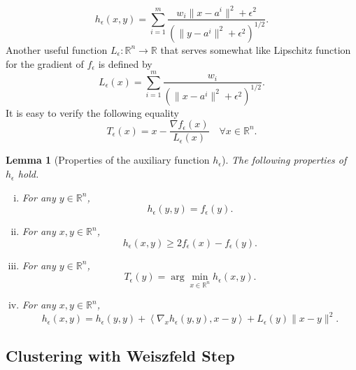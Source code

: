 \documentclass[11pt]{article}
\numberwithin{equation}{section}
\newtheorem{lemma}{Lemma}[proposition]
\begin{document}
\begin{equation*}
	h_{\epsilon}(x,y) = \sum\limits_{i=1}^m \frac{w_i \|x-a^i\|^2 + {\epsilon}^2}{\left( \|y-a^i\|^2 + {\epsilon}^2 \right)^{1/2}} .
\end{equation*}
Another useful function $L_{\epsilon}: \mathbb{R}^n \rightarrow \mathbb{R}$ that serves somewhat like Lipschitz function for the gradient of $f_{\epsilon}$ is defined by
\begin{equation*}
	L_{\epsilon}(x) = \sum\limits_{i=1}^{m}\frac{w_i}{\left( \|x - a^i\|^2 + {\epsilon}^2 \right)^{1/2}} .
\end{equation*}
It is easy to verify the following equality
\begin{equation}
	T_{\epsilon}(x) = x - \frac{\nabla f_{\epsilon}(x)}{L_{\epsilon}(x)} \quad \forall x \in \mathbb{R}^n . \label{StateEq62}
\end{equation}

\begin{lemma}[Properties of the auxiliary function $h_{\epsilon}$]
The following properties of $h_{\epsilon}$ hold.
\begin{enumerate}[(i)]
	\item For any $y \in \mathbb{R}^n$,
	\begin{equation*}
		h_{\epsilon}(y,y) = f_{\epsilon}(y) .
	\end{equation*}
	\item For any $x,y \in \mathbb{R}^n$,
	\begin{equation*}
		h_{\epsilon}(x,y) \geq 2f_{\epsilon}(x) - f_{\epsilon}(y) .
	\end{equation*}
	\item For any $y \in \mathbb{R}^n$,
	\begin{equation*}
	 	T_{\epsilon}(y) = \arg\!\min_{x \in \mathbb{R}^n} h_{\epsilon}(x,y) .
	 \end{equation*}
	\item For any $x,y \in \mathbb{R}^n$,
	\begin{equation*}
		h_{\epsilon}(x,y) = h_{\epsilon}(y,y) + \left\langle \nabla_x h_{\epsilon}(y,y) , x-y \right\rangle + L_{\epsilon}(y) \|x-y\|^2 .
	\end{equation*}
\end{enumerate}
\end{lemma}

\subsection{Clustering with Weiszfeld Step}
\end{document}
